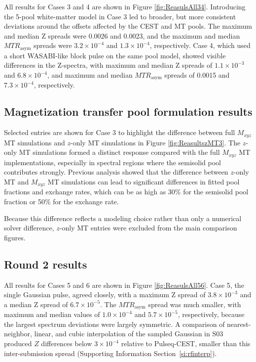 \documentclass[11pt,a4paper]{article}
\begin{document}
All results for Cases 3 and 4 are shown in Figure \ref{fig:ReasulsAll34}. Introducing the 5-pool white-matter model in Case 3 led to broader, but more consistent deviations around the offsets affected by the CEST and MT pools. The maximum and median Z spreads were 0.0026 and 0.0023, and the maximum and median $MTR_{\mathrm{asym}}$ spreads were $3.2 \times 10^{-4}$ and $1.3 \times 10^{-4}$, respectively. Case 4, which used a short WASABI-like block pulse on the same pool model, showed visible differences in the Z-spectra, with maximum and median Z spreads of $1.1 \times 10^{-3}$ and $6.8 \times 10^{-4}$, and maximum and median $MTR_{\mathrm{asym}}$ spreads of 0.0015 and $7.3 \times 10^{-4}$, respectively.

\subsection{Magnetization transfer pool formulation results}\label{subsec:res:zMT}
Selected entries are shown for Case 3 to highlight the difference between full $M_{xyz}$ MT simulations and $z$-only MT simulations in Figure \ref{fig:ReasultszMT3}. The $z$-only MT simulations formed a distinct response compared with the full $M_{xyz}$ MT implementations, especially in spectral regions where the semisolid pool contributes strongly. 
Previous analysis \cite{Schuenke2023} showed that the difference between $z$-only MT and $M_{xyz}$ MT simulations can lead to significant differences in fitted pool fractions and exchange rates, which can be as high as 30\% for the semisolid pool fraction or 50\% for the exchange rate.

Because this difference reflects a modeling choice rather than only a numerical solver difference, $z$-only MT entries were excluded from the main comparison figures. 



\subsection{Round 2 results}
All results for Cases 5 and 6 are shown in Figure \ref{fig:ReasulsAll56}. Case 5, the single Gaussian pulse, agreed closely, with a maximum Z spread of $3.8 \times 10^{-3}$ and a median Z spread of $6.7 \times 10^{-5}$. The $MTR_{\mathrm{asym}}$ spread was much smaller, with maximum and median values of $1.0 \times 10^{-4}$ and $5.7 \times 10^{-5}$, respectively, because the largest spectrum deviations were largely symmetric.
A comparison of nearest-neighbor, linear, and cubic interpolation of the sampled Gaussian in S03 produced $Z$ differences below $3\times10^{-4}$ relative to Pulseq-CEST, smaller than this inter-submission spread (Supporting Information Section~\ref{si:rfinterp}).
\end{document}

